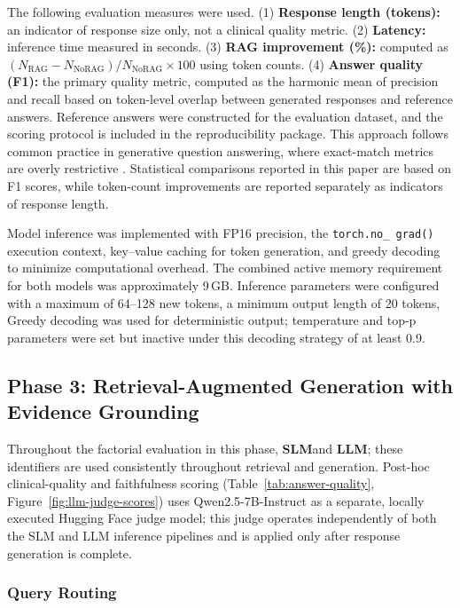 The following evaluation measures were used. (1) \textbf{Response length 
(tokens):} an indicator of response size only, not a clinical quality metric. 
(2) \textbf{Latency:} inference time measured in seconds. (3) \textbf{RAG 
improvement (\%):} computed as $(N_{\mathrm{RAG}} - N_{\mathrm{NoRAG}}) / 
N_{\mathrm{NoRAG}} \times 100$ using token counts. (4) \textbf{Answer quality 
(F1):} the primary quality metric, computed as the harmonic mean of precision 
and recall based on token-level overlap between generated responses and 
reference answers. Reference answers were constructed for the evaluation 
dataset, and the scoring protocol is included in the reproducibility package. 
This approach follows common practice in generative question answering, where 
exact-match metrics are overly restrictive \cite{tam2024quest}. Statistical 
comparisons reported in this paper are based on F1 scores, while token-count 
improvements are reported separately as indicators of response length.

Model inference was implemented with FP16 precision, the \texttt{torch.no\_
grad()} execution context, key--value caching for token generation, and 
greedy decoding to minimize computational overhead. The combined active memory 
requirement for both models was approximately 9\,GB. Inference parameters 
were configured with a maximum of 64--128 new tokens, a minimum output length 
of 20 tokens, Greedy decoding was used for deterministic output; temperature 
and top-p parameters were set but inactive under this decoding strategy of at 
least 0.9.

\subsection{Phase 3: Retrieval-Augmented Generation with Evidence Grounding}
\label{phase3}

Throughout the factorial evaluation in this phase, \textbf{SLM}and 
\textbf{LLM}; these identifiers are used consistently throughout retrieval and generation. Post-hoc clinical-quality and faithfulness scoring 
(Table~\ref{tab:answer-quality}, Figure~\ref{fig:llm-judge-scores}) uses Qwen2.5-7B-Instruct as a separate, locally executed Hugging 
Face judge model; this judge operates independently of both the SLM and LLM 
inference pipelines and is applied only after response generation is complete.

\subsubsection{Query Routing}

